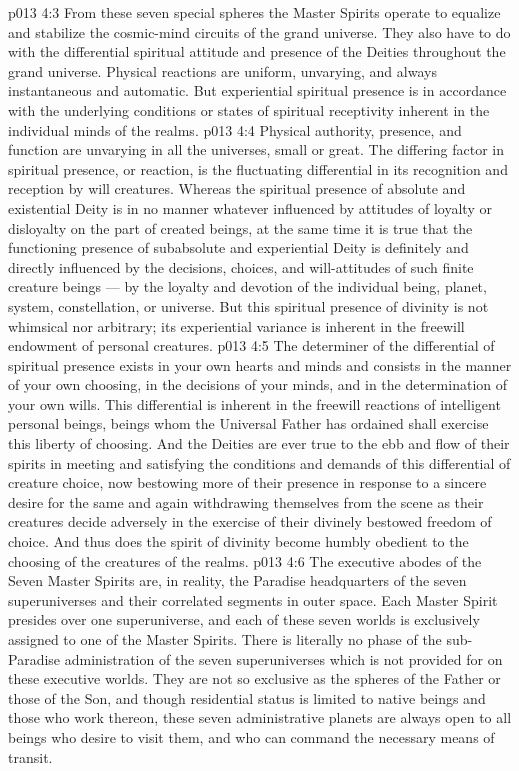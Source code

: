 \vs p013 4:3 From these seven special spheres the Master Spirits operate to equalize and stabilize the cosmic\hyp{}mind circuits of the grand universe. They also have to do with the differential spiritual attitude and presence of the Deities throughout the grand universe. Physical reactions are uniform, unvarying, and always instantaneous and automatic. But experiential spiritual presence is in accordance with the underlying conditions or states of spiritual receptivity inherent in the individual minds of the realms.
\vs p013 4:4 \pc Physical authority, presence, and function are unvarying in all the universes, small or great. The differing factor in spiritual presence, or reaction, is the fluctuating differential in its recognition and reception by will creatures. Whereas the spiritual presence of absolute and existential Deity is in no manner whatever influenced by attitudes of loyalty or disloyalty on the part of created beings, at the same time it is true that the functioning presence of subabsolute and experiential Deity is definitely and directly influenced by the decisions, choices, and will\hyp{}attitudes of such finite creature beings --- by the loyalty and devotion of the individual being, planet, system, constellation, or universe. But this spiritual presence of divinity is not whimsical nor arbitrary; its experiential variance is inherent in the freewill endowment of personal creatures.
\vs p013 4:5 The determiner of the differential of spiritual presence exists in your own hearts and minds and consists in the manner of your own choosing, in the decisions of your minds, and in the determination of your own wills. This differential is inherent in the freewill reactions of intelligent personal beings, beings whom the Universal Father has ordained shall exercise this liberty of choosing. And the Deities are ever true to the ebb and flow of their spirits in meeting and satisfying the conditions and demands of this differential of creature choice, now bestowing more of their presence in response to a sincere desire for the same and again withdrawing themselves from the scene as their creatures decide adversely in the exercise of their divinely bestowed freedom of choice. And thus does the spirit of divinity become humbly obedient to the choosing of the creatures of the realms.
\vs p013 4:6 \pc The executive abodes of the Seven Master Spirits are, in reality, the Paradise headquarters of the seven superuniverses and their correlated segments in outer space. Each Master Spirit presides over one superuniverse, and each of these seven worlds is exclusively assigned to one of the Master Spirits. There is literally no phase of the sub\hyp{}Paradise administration of the seven superuniverses which is not provided for on these executive worlds. They are not so exclusive as the spheres of the Father or those of the Son, and though residential status is limited to native beings and those who work thereon, these seven administrative planets are always open to all beings who desire to visit them, and who can command the necessary means of transit.
